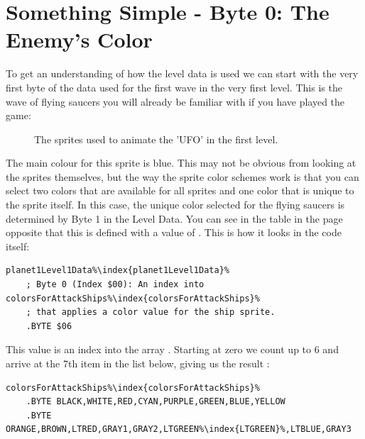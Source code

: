 \section{Something Simple - Byte 0: The Enemy's Color}
To get an understanding of how the level data is used we can start with the very first byte of the data
used for the first wave in the very first level. This is the wave of flying saucers you will already be
familiar with if you have played the game:
\begin{figure}[H]
  {
    \setlength{\tabcolsep}{3.0pt}
    \setlength\cmidrulewidth{\heavyrulewidth} %
	\centering
	\def\MULTICOLORONE{white}
	\def\MULTICOLORTWO{red}
	\def\SPRITECOLOR{blue}
	\begin{subfigure}{0.3\textwidth}
		
	\end{subfigure}
	\begin{subfigure}{0.3\textwidth}
		
	\end{subfigure}
	\begin{subfigure}{0.3\textwidth}
		
	\end{subfigure}
  }\caption[position=top]{The sprites used to animate the 'UFO' in the first level.}
\end{figure}

The main colour for this sprite is blue. This may not be obvious from looking at the sprites themselves, but
the way the sprite color schemes work is that you can select two colors that are available for all sprites and
one color that is unique to the sprite itself. In this case, the unique color selected for the flying saucers is
determined by Byte 1 in the Level Data. You can see in the table in the page opposite
that this is defined with a value of . This is how it looks in the code itself:

\begin{lstlisting}[escapechar=\%]
planet1Level1Data%\index{planet1Level1Data}%
    ; Byte 0 (Index $00): An index into colorsForAttackShips%\index{colorsForAttackShips}% 
    ; that applies a color value for the ship sprite.
    .BYTE $06
\end{lstlisting}

This value is an index into the array . Starting at zero we count up to 6
and arrive at the 7th item in the list below, giving us the result :
\begin{lstlisting}[escapechar=\%]
colorsForAttackShips%\index{colorsForAttackShips}%
    .BYTE BLACK,WHITE,RED,CYAN,PURPLE,GREEN,BLUE,YELLOW
    .BYTE ORANGE,BROWN,LTRED,GRAY1,GRAY2,LTGREEN%\index{LTGREEN}%,LTBLUE,GRAY3
\end{lstlisting}


